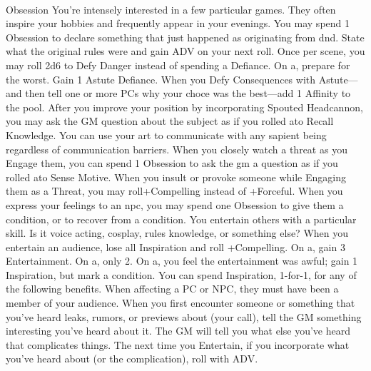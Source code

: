 \documentclass{dw2_playbook}
\begin{document}
\clearpage
~

\pageTwo
    {
      Obsession
    }
    {
      You're intensely interested in a few particular games. They often inspire your hobbies and frequently appear in your evenings.
    }
    {
          {
You may spend 1 Obsession to declare something that just happened as originating from dnd. State what the original rules were and gain ADV on your next roll.
        }
          {
Once per scene, you may roll 2d6 to Defy Danger instead of spending a Defiance.  On a\sixminus, prepare for the worst.
          }
          {
Gain 1 Astute Defiance. When you Defy Consequences with Astute—and then tell one or more PCs why your choce was the best—add 1 Affinity to the pool.
          }
          {
After you improve your position by incorporating Spouted Headcannon, you may ask the GM question about the subject as if you rolled a\tenplus to Recall Knowledge.
          }
          {
You can use your art to communicate with any sapient being regardless of communication barriers.
          }
          {
When you closely watch a threat as you Engage them, you can spend 1 Obsession to ask the gm a question as if you rolled a\tenplus to Sense Motive.
          }
          {
When you insult or provoke someone while Engaging them as a Threat, you may roll+Compelling instead of +Forceful.
          }
          {
When you express your feelings to an npc, you may spend one Obsession to give them a condition, or to recover from a condition.
          }
    }
    {
          {
            You entertain others with a particular skill. Is it voice acting, cosplay, rules knowledge, or something else? When you entertain an audience, lose all Inspiration and roll +Compelling. On a\tenplus, gain 3 Entertainment. On a\sevennine, only 2. On a\sixminus, you feel the entertainment was awful; gain 1 Inspiration, but mark a condition.
            \gap
            You can spend Inspiration, 1-for-1, for any of the following benefits. When affecting a PC or NPC, they must have been a member of your audience.
            \gap
          }
        \gap
          {
            When you first encounter someone or something that you’ve heard leaks, rumors, or previews about (your call), tell the GM something interesting you’ve heard about it. The GM will tell you what else you’ve heard that complicates things. The next time you Entertain, if you incorporate what you’ve heard about (or the complication), roll with ADV.
          }
    }
\end{document}
